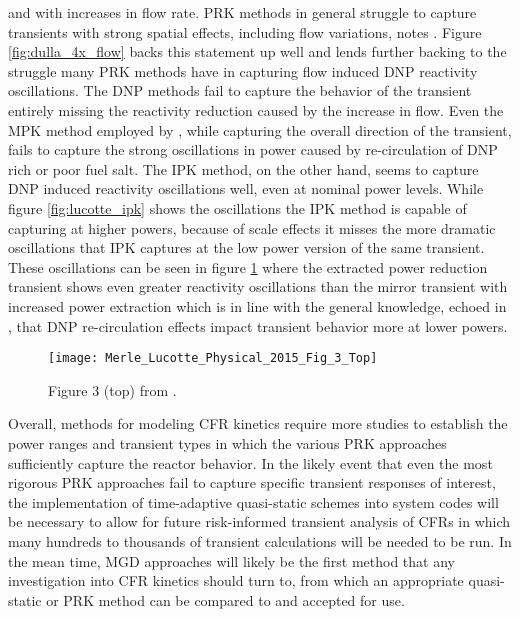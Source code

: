 \documentclass[review]{elsarticle}
\begin{document}
and with increases in flow rate. PRK methods in general struggle to capture
transients with strong spatial effects, including flow variations, notes 
\cite{dulla_models_2005}. Figure \ref{fig:dulla_4x_flow} backs this statement
up well and lends further backing to the struggle many PRK methods have
in capturing flow induced DNP reactivity oscillations. The DNP methods fail
to capture the behavior of the transient entirely missing the reactivity
reduction caused by the increase in flow. Even the MPK method employed by
\cite{dulla_models_2005}, while capturing the overall direction of the
transient, fails to capture the strong oscillations in power caused by
re-circulation of DNP rich or poor fuel salt. The IPK method, on the other hand,
seems to capture DNP induced reactivity oscillations well, even at nominal
power levels. While figure \ref{fig:lucotte_ipk} shows the oscillations the
IPK method is capable of capturing at higher powers, because of scale effects
it misses the more dramatic oscillations that IPK captures at the low power
version of the same transient. These oscillations can be seen in figure
\ref{fig:lucotte_ipk_reac} where the extracted power reduction transient shows
even greater reactivity oscillations than the mirror transient with increased
power extraction which is in line with the general knowledge, echoed in
\cite{zanetti_development_2016}, that DNP re-circulation effects impact
transient behavior more at lower powers.

\begin{figure}[h]
   \centering
   \texttt{[image: Merle\_Lucotte\_Physical\_2015\_Fig\_3\_Top]}
   \caption{Figure 3 (top) from \cite{merle-lucotte_physical_2015}.} 
   \label{fig:lucotte_ipk_reac}
\end{figure}

\par Overall, methods for modeling CFR kinetics require more studies to establish the power ranges and transient
types in which the various PRK approaches sufficiently capture the reactor behavior.
In the likely event that even the most rigorous PRK approaches fail to capture
specific transient responses of interest, the implementation of time-adaptive
quasi-static schemes into system codes will be necessary to allow for future
risk-informed transient analysis of CFRs in which many hundreds to thousands
of transient calculations will be needed to be run. In the mean time, MGD
approaches will likely be the first method that any investigation into CFR kinetics
should turn to, from which an appropriate quasi-static or PRK method can be compared to and accepted for use.
\end{document}
